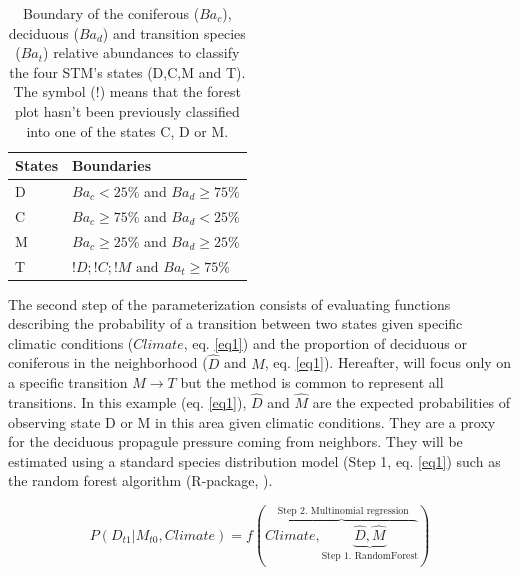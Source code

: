 %
%

\begin{table}[h]
\vspace{-1em}
\centering
\caption{Boundary of the coniferous ($Ba_c$), deciduous ($Ba_d$) and transition species ($Ba_t$) relative abundances to classify the four STM's states (D,C,M and T). The symbol ($!$) means that the forest plot hasn't been previously classified into one of the states C, D or M.}
\vspace{-1em}
\small
\begin{tabular}{|l|l|}
	\hline
	\textbf{States}  & \textbf{Boundaries}                            \\
	\hline
	D & $Ba_c< 25\%$ and $Ba_d \geq 75\%$    \\
	C & $Ba_c \geq 75\%$ and $Ba_d < 25\%$    \\
	M & $Ba_c \geq 25\%$ and $Ba_d \geq 25\%$ \\
	T & $!D;!C;!M \text{ and }  Ba_t  \geq 75\%$ \\
	\hline                               
\end{tabular}

\label{bound}
\end{table}

The second step of the parameterization consists of evaluating functions
describing the probability of a transition between two states given specific
climatic conditions ($Climate$, eq. \ref{eq1}) and the proportion of deciduous
or coniferous in the neighborhood ($\hat{D}$ and $\hat{M}$, eq. \ref{eq1}).
Hereafter, will focus only on a specific transition $M \rightarrow T$ but the
method is common to represent  all transitions. In this example (eq.
\ref{eq1}),  $\hat{D}$ and $\hat{M}$ are the expected probabilities of
observing state D or M in this area given climatic conditions. They are a proxy
for the deciduous propagule pressure coming from neighbors. They will be
estimated using  a standard species distribution model (Step 1, eq. \ref{eq1})
such as the random forest algorithm (R-package, \cite{Liaw2002a}).

\begin{equation}
	P(D_{t1}|M_{t0}, Climate) = f(\overbrace{Climate, \underbrace{\hat{D}, \hat{M}}_\text{Step 1. RandomForest}}^\text{ Step 2. Multinomial regression})
\label{eq1}
\end{equation}

